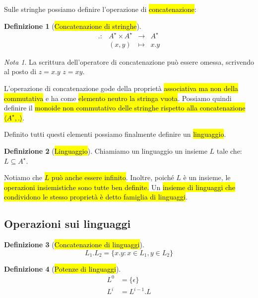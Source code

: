 \documentclass[a4paper,11pt,oneside]{article}
\theoremstyle{plain}
\theoremstyle{definition}
\newtheorem{defn}{Definizione}[section]
\theoremstyle{remark}
\newtheorem*{nota}{Nota}
\begin{document}
Sulle stringhe possiamo definire l'operazione di \hl{concatenazione}:

\begin{defn}[\hl{Concatenazione di stringhe}]\label{def:concatenazione-stringhe}
  \begin{equation}
    \begin{array}{cccc}
      . : & A^\star \times A^\star & \to & A^\star \\
          & (x, y) & \mapsto & x.y
    \end{array}
  \end{equation}
\end{defn}

\begin{nota}
  La scrittura dell'operatore di concatenazione può essere omessa, scrivendo al
  posto di $z = x.y$ $z = xy$.
\end{nota}

L'operazione di concatenazione gode della proprietà \hl{associativa ma non della
commutativa} e ha come \hl{elemento neutro la stringa vuota}. Possiamo quindi
definire il \hl{monoide non commutativo delle stringhe rispetto alla
concatenazione $\langle A^\star, . \rangle$}.

Definito tutti questi elementi possiamo finalmente definire un \hl{linguaggio}.

\begin{defn}[\hl{Linguaggio}]\label{def:linguaggio}
  Chiamiamo un linguaggio un insieme $L$ tale che: $L \subseteq A^\star$.
\end{defn}

Notiamo che \hl{$L$ può anche essere infinito}. Inoltre, poiché $L$ è un
insieme, le \hl{operazioni insiemistiche sono tutte ben definite.} Un
\hl{insieme di linguaggi che condividono le stesso proprietà è detto famiglia di
linguaggi}.

\subsection{Operazioni sui linguaggi}

\begin{defn}[\hl{Concatenazione di linguaggi}]\label{def:concatenazione-ling}
  \begin{equation}
    L_1 . L_2 = \{ x.y : x \in L_1, y \in L_2 \}
  \end{equation}
\end{defn}

\begin{defn}[\hl{Potenze di linguaggi}]\label{def:potenze-linguaggi}
  \begin{equation}
    \begin{aligned}
      L^0 & = \{\epsilon\} \\
      L^i & = L^{i-1}.L
    \end{aligned}
  \end{equation}
\end{defn}
\end{document}
